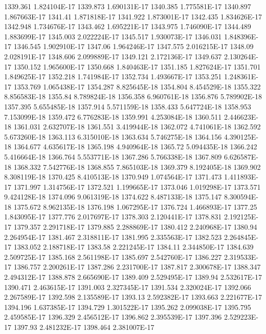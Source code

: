 1339.361  1.824104E-17
1339.873  1.690131E-17
1340.385  1.775581E-17
1340.897  1.867663E-17
1341.41  1.871818E-17
1341.922  1.873001E-17
1342.435  1.834626E-17
1342.948  1.734676E-17
1343.462  1.695221E-17
1343.975  1.746090E-17
1344.489  1.883699E-17
1345.003  2.022224E-17
1345.517  1.930073E-17
1346.031  1.848396E-17
1346.545  1.902910E-17
1347.06  1.964246E-17
1347.575  2.016215E-17
1348.09  2.028191E-17
1348.606  2.099889E-17
1349.121  2.172136E-17
1349.637  2.130264E-17
1350.152  1.965600E-17
1350.668  1.840463E-17
1351.185  1.827624E-17
1351.701  1.849625E-17
1352.218  1.741984E-17
1352.734  1.493667E-17
1353.251  1.248361E-17
1353.769  1.065438E-17
1354.287  8.825645E-18
1354.804  8.454529E-18
1355.322  8.856583E-18
1355.84  8.789824E-18
1356.358  6.960761E-18
1356.876  5.789902E-18
1357.395  5.655485E-18
1357.914  5.571159E-18
1358.433  5.647724E-18
1358.953  7.153099E-18
1359.472  6.776283E-18
1359.991  4.253084E-18
1360.511  2.446623E-18
1361.031  2.632707E-18
1361.551  3.419944E-18
1362.072  4.741061E-18
1362.592  5.673260E-18
1363.113  6.315010E-18
1363.634  5.746275E-18
1364.156  4.390125E-18
1364.677  4.635617E-18
1365.198  4.940964E-18
1365.72  5.094435E-18
1366.242  5.416664E-18
1366.764  5.553771E-18
1367.286  5.766338E-18
1367.809  6.626587E-18
1368.332  7.542776E-18
1368.855  7.865103E-18
1369.379  8.192405E-18
1369.902  8.308119E-18
1370.425  8.410513E-18
1370.949  1.074564E-17
1371.473  1.411893E-17
1371.997  1.314756E-17
1372.521  1.199665E-17
1373.046  1.019298E-17
1373.571  9.424128E-18
1374.096  9.061319E-18
1374.622  8.487133E-18
1375.147  8.300594E-18
1375.672  8.962135E-18
1376.198  1.067295E-17
1376.724  1.466893E-17
1377.25  1.843095E-17
1377.776  2.017697E-17
1378.303  2.120441E-17
1378.831  2.192125E-17
1379.357  2.291718E-17
1379.885  2.288869E-17
1380.412  2.240968E-17
1380.94  2.264954E-17
1381.467  2.318811E-17
1381.995  2.335563E-17
1382.523  2.264845E-17
1383.052  2.188718E-17
1383.58  2.221245E-17
1384.11  2.344850E-17
1384.639  2.509725E-17
1385.168  2.561198E-17
1385.697  2.542760E-17
1386.227  2.319533E-17
1386.757  2.200261E-17
1387.286  2.231700E-17
1387.817  2.300678E-17
1388.347  2.494312E-17
1388.878  2.665690E-17
1389.409  2.529495E-17
1389.94  2.532617E-17
1390.471  2.463615E-17
1391.003  2.327345E-17
1391.534  2.320024E-17
1392.066  2.267589E-17
1392.598  2.135589E-17
1393.13  2.592382E-17
1393.663  2.221677E-17
1394.196  1.637385E-17
1394.729  1.301522E-17
1395.262  2.099038E-17
1395.795  2.459585E-17
1396.329  2.456512E-17
1396.862  2.395539E-17
1397.396  2.529223E-17
1397.93  2.481232E-17
1398.464  2.381007E-17
